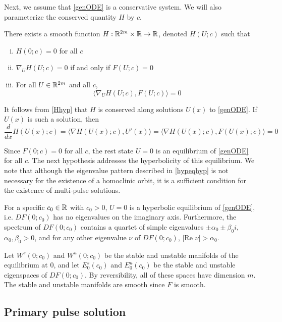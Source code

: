 \documentclass[thesis.tex]{subfiles}
\begin{document}
Next, we assume that \cref{genODE} is a conservative system. We will also parameterize the conserved quantity $H$ by $c$.

\begin{hypothesis}\label{Hhyp}
There exists a smooth function $H: \mathbb{R}^{2m} \times \mathbb{R} \rightarrow \mathbb{R}$, denoted $H(U; c)$ such that 
\begin{enumerate}[(i)]
\item $H(0; c) = 0$ for all $c$
\item $\nabla_U H(U; c) = 0$ if and only if $F(U; c) = 0$
\item For all $U \in \mathbb{R}^{2m}$ and all $c$,
\begin{equation}
\langle \nabla_U H(U; c), F(U; c) \rangle = 0
\end{equation}
\end{enumerate}
\end{hypothesis}

It follows from \cref{Hhyp} that $H$ is conserved along solutions $U(x)$ to \cref{genODE}. If $U(x)$ is such a solution, then
\[
\frac{d}{dx}H(U(x); c) = \langle \nabla H(U(x); c), U'(x) \rangle
= \langle \nabla H(U(x); c), F(U(x); c) \rangle = 0
\]

Since $F(0; c) = 0$ for all $c$, the rest state $U = 0$ is an equilibrium of \cref{genODE} for all $c$. The next hypothesis addresses the hyperbolicity of this equilibrium. We note that although the eigenvalue pattern described in \cref{hypeqhyp} is not necessary for the existence of a homoclinic orbit, it is a sufficient condition for the existence of multi-pulse solutions.

\begin{hypothesis}\label{hypeqhyp}
For a specific $c_0 \in \mathbb{R}$ with $c_0 > 0$, $U = 0$ is a hyperbolic equilibrium of \cref{genODE}, i.e. $DF(0; c_0)$ has no eigenvalues on the imaginary axis. Furthermore, the spectrum of $DF(0; c_0)$ contains a quartet of simple eigenvalues $\pm \alpha_0 \pm \beta_0 i$, $\alpha_0, \beta_0 > 0$, and for any other eigenvalue $\nu$ of $DF(0; c_0)$, $|\text{Re }\nu| > \alpha_0$.
\end{hypothesis}

Let $W^s(0; c_0)$ and $W^u(0; c_0)$ be the stable and unstable manifolds of the equilibrium at 0, and let $E_0^s(c_0)$ and $E_0^u(c_0)$ be the stable and unstable eigenspaces of $DF(0; c_0)$. By reversibility, all of these spaces have dimension $m$. The stable and unstable manifolds are smooth since $F$ is smooth.

\subsection{Primary pulse solution}\label{sec:primarypulse}
\end{document}

